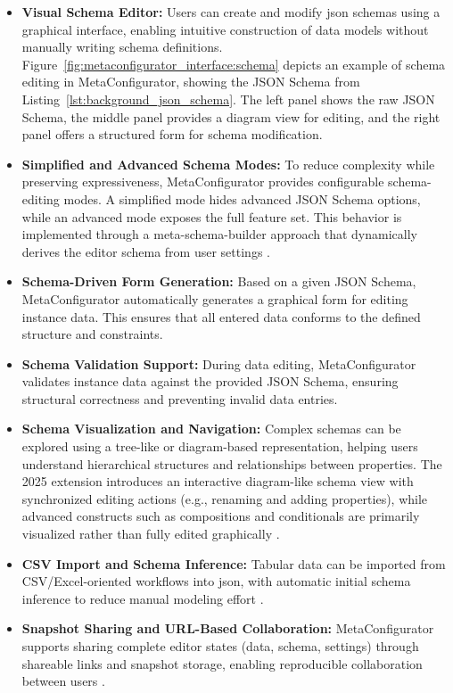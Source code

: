 \begin{itemize}
    \item \textbf{Visual Schema Editor:}  
    Users can create and modify \gls{json} schemas using a graphical interface, enabling intuitive construction of data models without manually writing schema definitions. Figure~\ref{fig:metaconfigurator_interface:schema} depicts an example of schema editing in MetaConfigurator, showing the JSON Schema from Listing~\ref{lst:background_json_schema}. The left panel shows the raw JSON Schema, the middle panel provides a diagram view for editing, and the right panel offers a structured form for schema modification.

    \item \textbf{Simplified and Advanced Schema Modes:}
    To reduce complexity while preserving expressiveness, MetaConfigurator provides configurable schema-editing modes. A simplified mode hides advanced JSON Schema options, while an advanced mode exposes the full feature set. This behavior is implemented through a meta-schema-builder approach that dynamically derives the editor schema from user settings \cite{metaconfigurator2025datamodels}.

    \item \textbf{Schema-Driven Form Generation:}  
    Based on a given JSON Schema, MetaConfigurator automatically generates a graphical form for editing instance data. This ensures that all entered data conforms to the defined structure and constraints.

    \item \textbf{Schema Validation Support:}  
    During data editing, MetaConfigurator validates instance data against the provided JSON Schema, ensuring structural correctness and preventing invalid data entries.

    \item \textbf{Schema Visualization and Navigation:}  
    Complex schemas can be explored using a tree-like or diagram-based representation, helping users understand hierarchical structures and relationships between properties. The 2025 extension introduces an interactive diagram-like schema view with synchronized editing actions (e.g., renaming and adding properties), while advanced constructs such as compositions and conditionals are primarily visualized rather than fully edited graphically \cite{metaconfigurator2025datamodels}.

    \item \textbf{CSV Import and Schema Inference:}
    Tabular data can be imported from CSV/Excel-oriented workflows into \gls{json}, with automatic initial schema inference to reduce manual modeling effort \cite{metaconfigurator2025datamodels}.

    \item \textbf{Snapshot Sharing and URL-Based Collaboration:}
    MetaConfigurator supports sharing complete editor states (data, schema, settings) through shareable links and snapshot storage, enabling reproducible collaboration between users \cite{metaconfigurator2025datamodels}.

\end{itemize}

